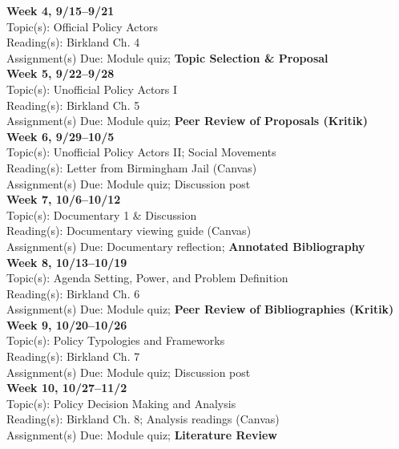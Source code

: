 \documentclass[12pt]{article}     %
\begin{document}
\noindent \textbf{Week 4, 9/15--9/21}\\
Topic(s): Official Policy Actors\\
Reading(s): Birkland Ch. 4\\
Assignment(s) Due: Module quiz; \textbf{Topic Selection \& Proposal}\\

\noindent \textbf{Week 5, 9/22--9/28}\\
Topic(s): Unofficial Policy Actors I\\
Reading(s): Birkland Ch. 5\\
Assignment(s) Due: Module quiz; \textbf{Peer Review of Proposals (Kritik)}\\

\noindent \textbf{Week 6, 9/29--10/5}\\
Topic(s): Unofficial Policy Actors II; Social Movements\\
Reading(s): Letter from Birmingham Jail (Canvas)\\
Assignment(s) Due: Module quiz; Discussion post\\

\noindent \textbf{Week 7, 10/6--10/12}\\
Topic(s): Documentary 1 \& Discussion\\
Reading(s): Documentary viewing guide (Canvas)\\
Assignment(s) Due: Documentary reflection; \textbf{Annotated Bibliography}\\

\noindent \textbf{Week 8, 10/13--10/19}\\
Topic(s): Agenda Setting, Power, and Problem Definition\\
Reading(s): Birkland Ch. 6\\
Assignment(s) Due: Module quiz; \textbf{Peer Review of Bibliographies (Kritik)}\\

\noindent \textbf{Week 9, 10/20--10/26}\\
Topic(s): Policy Typologies and Frameworks\\
Reading(s): Birkland Ch. 7\\
Assignment(s) Due: Module quiz; Discussion post\\

\noindent \textbf{Week 10, 10/27--11/2}\\
Topic(s): Policy Decision Making and Analysis\\
Reading(s): Birkland Ch. 8; Analysis readings (Canvas)\\
Assignment(s) Due: Module quiz; \textbf{Literature Review}\\
\end{document}
